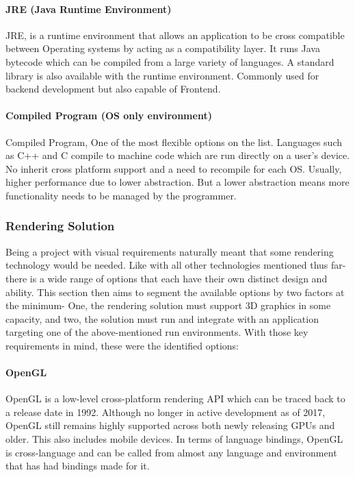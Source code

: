 \paragraph{JRE (Java Runtime Environment)}
JRE, is a runtime environment that allows an application to be cross compatible between Operating systems by acting as a compatibility layer. It runs Java bytecode which can be compiled from a large variety of languages. A standard library is also available with the runtime environment. Commonly used for backend development but also capable of Frontend.

\paragraph{Compiled Program (OS only environment)}
Compiled Program, One of the most flexible options on the list. Languages such as C++ and C compile to machine code which are run directly on a user’s device. No inherit cross platform support and a need to recompile for each OS. Usually, higher performance due to lower abstraction. But a lower abstraction means more functionality needs to be managed by the programmer.

\subsubsection{Rendering Solution}
Being a project with visual requirements naturally meant that some rendering technology would be needed. Like with all other technologies mentioned thus far- there is a wide range of options that each have their own distinct design and ability. This section then aims to segment the available options by two factors at the minimum- One, the rendering solution must support 3D graphics in some capacity, and two, the solution must run and integrate with an application targeting one of the above-mentioned run environments. With those key requirements in mind, these were the identified options:

\paragraph{OpenGL}
OpenGL is a low-level cross-platform rendering API which can be traced back to a release date in 1992. Although no longer in active development as of 2017, OpenGL still remains highly supported across both newly releasing GPUs and older. This also includes mobile devices. In terms of language bindings, OpenGL is cross-language and can be called from almost any language and environment that has had bindings made for it.

